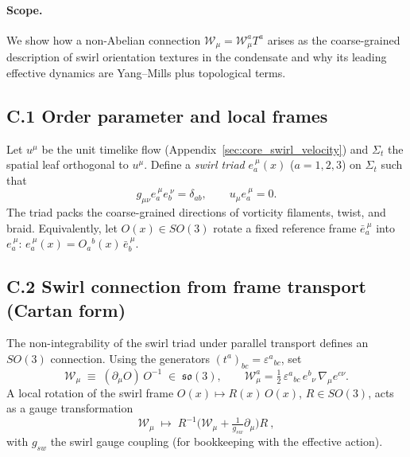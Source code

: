 \documentclass[11pt, preprint,titlepage]{revtex4-2}
\begin{document}
		\paragraph{Scope.}
		We show how a non-Abelian connection \(\mathcal{W}_\mu=\mathcal{W}_\mu^a T^a\) arises as the coarse-grained description of swirl orientation textures in the condensate and why its leading effective dynamics are Yang–Mills plus topological terms.

		\subsection*{C.1 Order parameter and local frames}
		Let \(u^\mu\) be the unit timelike flow (Appendix~\ref{sec:core_swirl_velocity}) and \(\Sigma_t\) the spatial leaf orthogonal to \(u^\mu\).
		Define a \emph{swirl triad} \(e_a^{\ \mu}(x)\) (\(a=1,2,3\)) on \(\Sigma_t\) such that
		\[
		g_{\mu\nu}e_a^{\ \mu}e_b^{\ \nu}=\delta_{ab},\qquad u_\mu e_a^{\ \mu}=0.
		\]
		The triad packs the coarse-grained directions of vorticity filaments, twist, and braid. Equivalently, let \(O(x)\in SO(3)\) rotate a fixed reference frame \(\bar e_a^{\ \mu}\) into \(e_a^{\ \mu}\):
		\(e_a^{\ \mu}(x)=O_a{}^{b}(x)\,\bar e_b^{\ \mu}\).

		\subsection*{C.2 Swirl connection from frame transport (Cartan form)}
		The non-integrability of the swirl triad under parallel transport defines an \(SO(3)\) connection.
		Using the generators \((t^a)_{bc}=\varepsilon^a{}_{bc}\), set
		\[
		\boxed{\quad \mathcal{W}_\mu \;\equiv\; (\partial_\mu O)\,O^{-1} \;\in\; \mathfrak{so}(3), \qquad
		\mathcal{W}_\mu^a=\tfrac12\,\varepsilon^{a}{}_{bc}\,e^{b}{}_{\nu}\,\nabla_\mu e^{c\nu}. \quad}
		\]
		A local rotation of the swirl frame \(O(x)\mapsto R(x)\,O(x)\), \(R\in SO(3)\), acts as a gauge transformation
		\[
		\boxed{\quad \mathcal{W}_\mu \;\longmapsto\; R^{-1}\!\Big(\mathcal{W}_\mu + \tfrac{1}{g_{\!sw}}\partial_\mu\Big)R\ ,\quad}
		\]
		with \(g_{\!sw}\) the swirl gauge coupling (for bookkeeping with the effective action).
\end{document}
